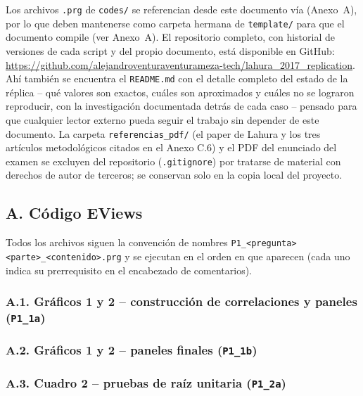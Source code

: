 \documentclass[12pt, letterpaper]{article}
\begin{document}
Los archivos \texttt{.prg} de \texttt{codes/} se referencian desde este
documento vía \lstinline{} (Anexo~A), por lo que deben
mantenerse como carpeta hermana de \texttt{template/} para que el
documento compile (ver Anexo~A). El repositorio completo, con
historial de versiones de cada script y del propio documento, está
disponible en GitHub:
\url{https://github.com/alejandroventuraventurameza-tech/lahura_2017_replication}.
Ahí también
se encuentra el \texttt{README.md} con el detalle completo del estado
de la réplica -- qué valores son exactos, cuáles son aproximados y
cuáles no se lograron reproducir, con la investigación documentada
detrás de cada caso -- pensado para que cualquier lector externo pueda
seguir el trabajo sin depender de este documento. La carpeta
\texttt{referencias\_pdf/} (el paper de Lahura y los tres artículos
metodológicos citados en el Anexo C.6) y el PDF del enunciado del
examen se excluyen del repositorio (\texttt{.gitignore}) por tratarse
de material con derechos de autor de terceros; se conservan solo en la
copia local del proyecto.

\subsection*{A. Código EViews}

Todos los archivos siguen la convención de nombres
\texttt{P1\_<pregunta><parte>\_<contenido>.prg} y se ejecutan en el
orden en que aparecen (cada uno indica su prerrequisito en el
encabezado de comentarios).

\subsubsection*{A.1. Gráficos 1 y 2 -- construcción de correlaciones y
                    paneles (\texttt{P1\_1a})}


\subsubsection*{A.2. Gráficos 1 y 2 -- paneles finales
                    (\texttt{P1\_1b})}


\subsubsection*{A.3. Cuadro 2 -- pruebas de raíz unitaria
                    (\texttt{P1\_2a})}

\end{document}
